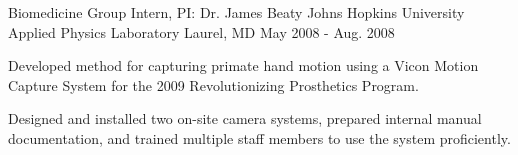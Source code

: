 \begin{cventries}
{    }
  \cventry
    {Biomedicine Group Intern, PI: Dr. James Beaty}
    {Johns Hopkins University Applied Physics Laboratory}
    {Laurel, MD}
    {May 2008 - Aug. 2008}
    {
      \begin{cvitems}
        \item {Developed method for capturing primate hand motion using a Vicon Motion Capture System for the 2009 Revolutionizing Prosthetics Program.}
        \item {Designed and installed two on-site camera systems, prepared internal manual documentation, and trained multiple staff members to use the system proficiently.}
      \end{cvitems}
    }
\end{cventries}
